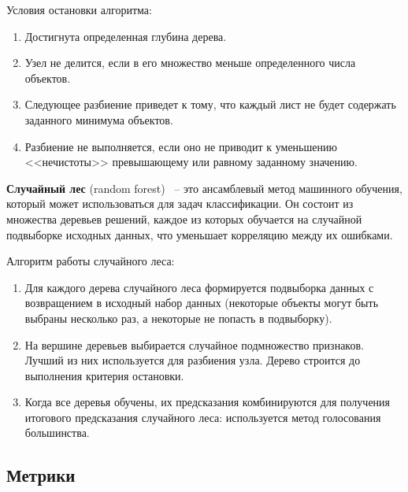 Условия остановки алгоритма:

\begin{enumerate}[itemindent=2cm, leftmargin=0cm, labelsep=0.3cm, topsep=0cm, itemsep=0cm, parsep=0cm, label=\arabic*., after=\vspace{-0.1cm}, before=\vspace{-0.1cm}]
    \item Достигнута определенная глубина дерева.
    \item Узел не делится, если в его множество меньше определенного числа объектов.
    \item Следующее разбиение приведет к тому, что каждый лист не будет содержать заданного минимума объектов.
    \item Разбиение не выполняется, если оно не приводит к уменьшению <<нечистоты>> превышающему или равному заданному значению.
\end{enumerate}


\textbf{Случайный лес} (random forest)~\cite{Breiman01} -- это ансамблевый метод машинного обучения, который может использоваться для задач классификации. Он состоит из множества деревьев решений, каждое из которых обучается на случайной подвыборке исходных данных, что уменьшает корреляцию между их ошибками.

Алгоритм работы случайного леса:

\begin{enumerate}[itemindent=2cm, leftmargin=0cm, labelsep=0.3cm, topsep=0cm, itemsep=0cm, parsep=0cm, label=\arabic*., after=\vspace{-0.1cm}, before=\vspace{-0.1cm}]
    \item Для каждого дерева случайного леса формируется подвыборка данных с возвращением в исходный набор данных (некоторые объекты могут быть выбраны несколько раз, а некоторые не попасть в подвыборку).
    \item На вершине деревьев выбирается случайное подмножество признаков. Лучший из них используется для разбиения узла. Дерево строится до выполнения критерия остановки.
    \item Когда все деревья обучены, их предсказания комбинируются для получения итогового предсказания случайного леса: используется метод голосования большинства. 
\end{enumerate}


\vspace{1.5em}
\subsection{Метрики}
\label{subsec:Metrics}

